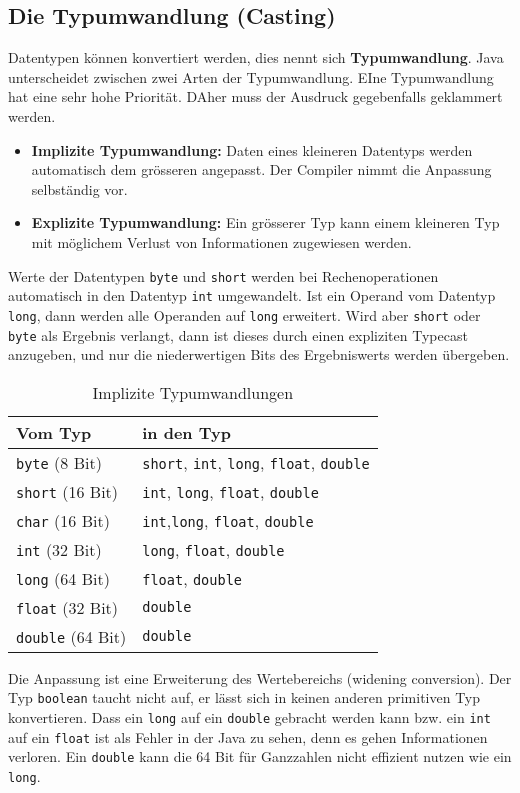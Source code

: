 \subsection{Die Typumwandlung (Casting)}
Datentypen können konvertiert werden, dies nennt sich \textbf{Typumwandlung}. Java unterscheidet zwischen zwei Arten der Typumwandlung. EIne Typumwandlung hat eine sehr hohe Priorität. DAher muss der Ausdruck gegebenfalls geklammert werden.
\begin{itemize}
\item \textbf{Implizite Typumwandlung:} Daten eines kleineren Datentyps werden automatisch dem grösseren angepasst. Der Compiler nimmt die Anpassung selbständig vor.
\item \textbf{Explizite Typumwandlung:} Ein grösserer Typ kann einem kleineren Typ mit möglichem Verlust von Informationen zugewiesen werden.
\end{itemize}
Werte der Datentypen \texttt{byte} und \texttt{short} werden bei Rechenoperationen automatisch in den Datentyp \texttt{int} umgewandelt. Ist ein Operand vom Datentyp \texttt{long}, dann werden alle Operanden auf \texttt{long} erweitert. Wird aber \texttt{short} oder \texttt{byte} als Ergebnis verlangt, dann ist dieses durch einen expliziten Typecast anzugeben, und nur die niederwertigen Bits des Ergebniswerts werden übergeben.
\begin{table}[H]
\centering
\begin{tabular}{ll}
\hline
Vom Typ&in den Typ\\\hline
\texttt{byte} (8 Bit)&\texttt{short}, \texttt{int}, \texttt{long}, \texttt{float}, \texttt{double}\\
\texttt{short} (16 Bit)&\texttt{int}, \texttt{long}, \texttt{float}, \texttt{double}\\
\texttt{char} (16 Bit)&\texttt{int},\texttt{long}, \texttt{float}, \texttt{double}\\
\texttt{int} (32 Bit)&\texttt{long}, \texttt{float}, \texttt{double}\\
\texttt{long} (64 Bit)&\texttt{float}, \texttt{double}\\
\texttt{float} (32 Bit)&\texttt{double}\\
\texttt{double} (64 Bit)&\texttt{double}\\\hline
\end{tabular}
\caption{Implizite Typumwandlungen}
\end{table}
\noindent Die Anpassung ist eine Erweiterung des Wertebereichs (widening conversion). Der Typ \texttt{boolean} taucht nicht auf, er lässt sich in keinen anderen primitiven Typ konvertieren. Dass ein \texttt{long} auf ein \texttt{double} gebracht werden kann bzw. ein \texttt{int} auf ein \texttt{float} ist als Fehler in der Java zu sehen, denn es gehen Informationen verloren. Ein \texttt{double} kann die 64 Bit für Ganzzahlen nicht effizient nutzen wie ein \texttt{long}.
